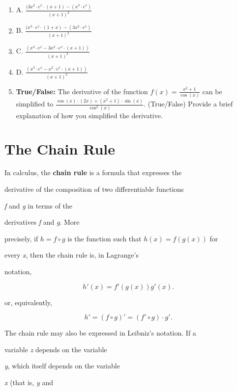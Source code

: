 {\begin{enumerate}
    \item A. $\frac{(3x^2 \cdot e^x \cdot (x + 1) - (x^3 \cdot e^x)}{(x + 1)^2}$
    \item B. $\frac{(x^3 \cdot e^x \cdot (1 + x) - (3x^2 \cdot e^x)}{(x + 1)^2}$
    \item C. $\frac{(x^3 \cdot e^x - 3x^2 \cdot e^x \cdot (x + 1))}{(x + 1)^2}$
    \item D. $\frac{(x^3 \cdot e^x - x^2 \cdot e^x \cdot (x + 1))}{(x + 1)^2}$
    \item \textbf{True/False:} The derivative of the function $f(x) = \frac{x^2 + 1}{\cos(x)}$ can be simplified to $\frac{\cos(x) \cdot (2x) + (x^2 + 1) \cdot \sin(x)}{\cos^2(x)}$. (True/False) Provide a brief explanation of how you simplified the derivative.
\end{enumerate}

\section{The Chain Rule}
\label{sec:the-chain-rule}

In calculus, the \textbf{chain rule} is a formula that expresses the

derivative of the composition of two differentiable functions

\textit{f} and \textit{g} in terms of the

derivatives \textit{f} and \textit{g}. More

precisely, if $h=f\circ g$ is the function such that $h(x)=f(g(x))$ for

every \textit{x}, then the chain rule is, in Lagrange's

notation,



$$h'(x) = f'(g(x)) g'(x).$$



or, equivalently,



$$h'=(f\circ g)'=(f'\circ g)\cdot g'.$$



The chain rule may also be expressed in Leibniz's notation. If a

variable \textit{z} depends on the variable

\textit{y}, which itself depends on the variable

\textit{x} (that is, \textit{y} and

}
